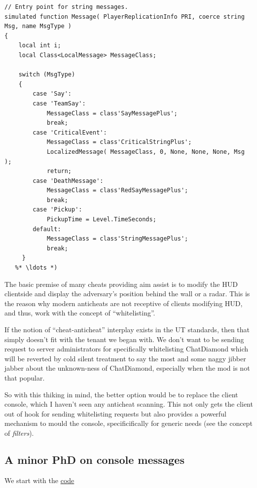 \documentclass{article}
\begin{document}
\begin{lstlisting}[frame=single]
// Entry point for string messages.
simulated function Message( PlayerReplicationInfo PRI, coerce string Msg, name MsgType )
{
    local int i;
    local Class<LocalMessage> MessageClass;

    switch (MsgType)
    {
        case 'Say':
        case 'TeamSay':
            MessageClass = class'SayMessagePlus';
            break;
        case 'CriticalEvent':
            MessageClass = class'CriticalStringPlus';
            LocalizedMessage( MessageClass, 0, None, None, None, Msg );
            return;
        case 'DeathMessage':
            MessageClass = class'RedSayMessagePlus';
            break;
        case 'Pickup':
            PickupTime = Level.TimeSeconds;
        default:
            MessageClass = class'StringMessagePlus';
            break;
     }
   %* \ldots *)           
\end{lstlisting}

The basic premise of many cheats providing aim assist is to modify the HUD clientside and display the adversary's position behind the wall or a radar.  This is the reason why modern anticheats are not receptive of clients modifying HUD, and thus, work with the concept of ``whitelisting''.

If the notion of ``cheat-anticheat'' interplay exists in the UT standards, then that simply doesn't fit with the tenant we began with.  We don't want to be sending request to server administrators for specifically whitelisting ChatDiamond which will be reverted by cold silent treatment to say the most and some naggy jibber jabber about the unknown-ness of ChatDiamond, especially when the mod is not that popular.

So with this thiking in mind, the better option would be to replace the client console, which I haven't seen any anticheat scanning. This not only gets the client out of hook for sending whitelisting requests but also provides a powerful mechanism to mould the console, specificifically for generic needs (see the concept of \emph{filters}).

\subsection{A minor PhD on console messages}

We start with the \href{http://uncodex.ut-files.com/UT/v436/Source_engine/playerpawn.html}{code} 
\end{document}

